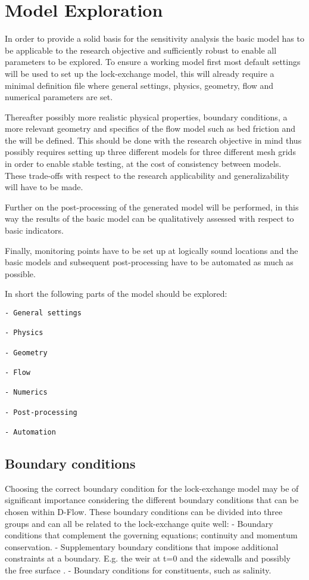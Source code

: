 \chapter{Model Exploration}\label{model-exploration}

In order to provide a solid basis for the sensitivity analysis the basic
model has to be applicable to the research objective and sufficiently
robust to enable all parameters to be explored. To ensure a working
model first most default settings will be used to set up the
lock-exchange model, this will already require a minimal definition file
where general settings, physics, geometry, flow and numerical parameters
are set.

Thereafter possibly more realistic physical properties, boundary
conditions, a more relevant geometry and specifics of the flow model
such as bed friction and the will be defined. This should be done with
the research objective in mind thus possibly requires setting up three
different models for three different mesh grids in order to enable
stable testing, at the cost of consistency between models. These
trade-offs with respect to the research applicability and
generalizability will have to be made.

Further on the post-processing of the generated model will be performed,
in this way the results of the basic model can be qualitatively assessed
with respect to basic indicators.

Finally, monitoring points have to be set up at logically sound
locations and the basic models and subsequent post-processing have to be
automated as much as possible.

In short the following parts of the model should be explored: 
\begin{verbatim}
- General settings

- Physics

- Geometry

- Flow

- Numerics

- Post-processing

- Automation
\end{verbatim}

\section{Boundary conditions}\label{boundary-conditions}

Choosing the correct boundary condition for the lock-exchange model may
be of significant importance considering the different boundary
conditions that can be chosen within D-Flow. These boundary conditions
can be divided into three groups and can all be related to the
lock-exchange quite well: - Boundary conditions that complement the
governing equations; continuity and momentum conservation. -
Supplementary boundary conditions that impose additional constraints at
a boundary. E.g. the weir at t=0 and the sidewalls and possibly the free
surface \citep{Adduce2012}. - Boundary conditions for constituents, such
as salinity.

